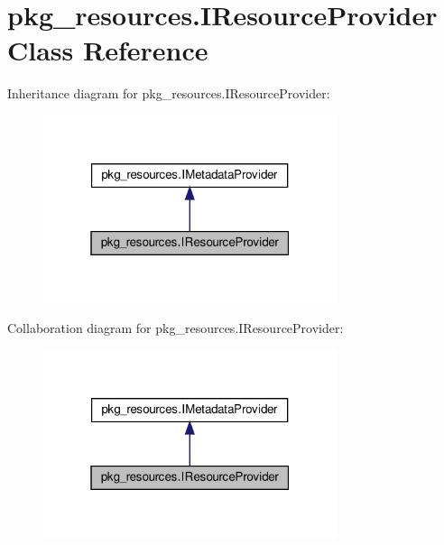 \hypertarget{classpkg__resources_1_1IResourceProvider}{}\section{pkg\+\_\+resources.\+I\+Resource\+Provider Class Reference}
\label{classpkg__resources_1_1IResourceProvider}


Inheritance diagram for pkg\+\_\+resources.\+I\+Resource\+Provider\+:
\nopagebreak
\begin{figure}[H]
\begin{center}
\leavevmode
\includegraphics[width=244pt]{classpkg__resources_1_1IResourceProvider__inherit__graph}
\end{center}
\end{figure}


Collaboration diagram for pkg\+\_\+resources.\+I\+Resource\+Provider\+:
\nopagebreak
\begin{figure}[H]
\begin{center}
\leavevmode
\includegraphics[width=244pt]{classpkg__resources_1_1IResourceProvider__coll__graph}
\end{center}
\end{figure}
